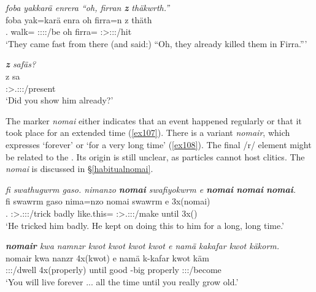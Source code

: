 \begin{exe}
	\ex \emph{foba yakkarä enrera ``oh, firran \textbf{z} thäkwrth.''}\\
	\gll foba yak=karä enra oh firra=n z thäth\\
	{\Dist}.{\Abl} walk={\Prop} \Stpl:\Sbj:\Pst:\Ipfv:\Venit/be oh firra={\Loc} {\Iam} \Stpl:\Sbj>\Stpl:\Obj:\Rpst:\Pfv/hit\\
	\trans `They came fast from there (and said:) ``Oh, they already killed them in Firra.''' 
	\label{ex130}
\end{exe}
\begin{exe}
	\ex \emph{\textbf{z} safäs?}\\
	\gll z sa\\
	{\Iam} \Stsg:\Sbj>\Tsg.\Masc:\Io:\Rpst:\Pfv/present\\
	\trans `Did you show him already?' 
	\label{ex106}
\end{exe}

\largerpage
The  marker \emph{nomai} either indicates that an event happened regularly or that it took place for an extended time (\ref{ex107}). There is a variant \emph{nomair}, which expresses `forever' or `for a very long time' (\ref{ex108}). The final /r/ element might be related to the  . Its origin is still unclear, as particles cannot host  clitics. The   \emph{nomai} is discussed in {\S}\ref{habitualnomai}.

\begin{exe}
	\ex \emph{fi swathugwrm gaso. nimanzo \textbf{nomai} swafiyokwrm e \textbf{nomai} \textbf{nomai} \textbf{nomai}.}\\
	\gll fi swawrm gaso nima=nzo nomai swawrm e 3x(nomai)\\
	\Tsg.{\Abs} \Stsg:\Sbj>\Tsg.\Masc:\Obj:\Pst:\Dur/trick badly {like.this}={\Only} \Hab{} \Stsg:\Sbj>\Tsg.\Masc:\Obj:\Pst:\Dur/make until 3x(\Hab)\\
	\trans `He tricked him badly. He kept on doing this to him for a long, long time.'\\ 
	\label{ex107}
\end{exe}
\begin{exe}
	\ex \emph{\textbf{nomair} kwa namnzr kwot kwot kwot kwot e namä kakafar kwot käkorm.}\\
	\gll nomair kwa nanzr 4x(kwot) e namä k-kafar kwot käm\\
	\Hab{} {\Fut} \Ssg:\Sbj:\Nonpast:\Ipfv/dwell 4x(properly) until good \Redup-big properly \Ssg:\Sbj:\Futimp:\Pfv/become\\
	\trans `You will live forever ... all the time until you really grow old.'\\ 
	\label{ex108}
\end{exe}

